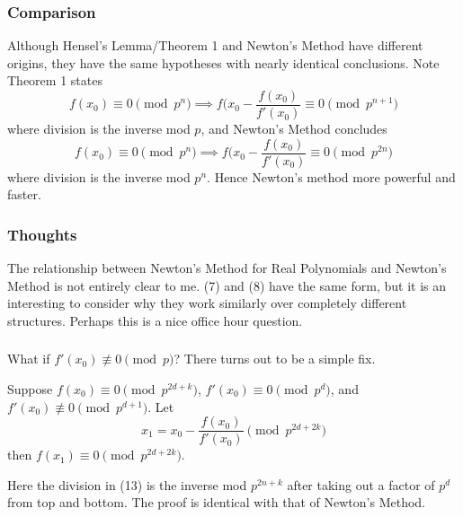 \documentclass{article}
\begin{document}
\subsubsection{Comparison}
Although Hensel's Lemma/Theorem 1 and Newton's Method have different origins, they have the same hypotheses with nearly identical conclusions. Note Theorem 1 states
\begin{equation}
    f(x_{0}) \equiv 0 \pmod{p^{n}} \implies
    f(x_{0}-\frac{f(x_{0})}{f'(x_{0})} \equiv 0 \pmod{p^{n+1}}
\end{equation}
where division is the inverse mod $p$, and Newton's Method concludes
\begin{equation}
    f(x_{0}) \equiv 0 \pmod{p^{n}} \implies
    f(x_{0}-\frac{f(x_{0})}{f'(x_{0})} \equiv 0 \pmod{p^{2n}}
\end{equation}
where division is the inverse mod $p^{n}$. Hence Newton's method more powerful and faster.

\subsubsection{Thoughts}
The relationship between Newton's Method for Real Polynomials and Newton's Method is not entirely clear to me. (7) and (8) have the same form, but it is an interesting to consider why they work similarly over completely different structures. Perhaps this is a nice office hour question.

\subsubsection{}
What if $f'(x_{0}) \not\equiv 0 \pmod{p}$? There turns out to be a simple fix.
\begin{thm}
    Suppose $f(x_{0}) \equiv 0 \pmod{p^{2d+k}}$, $f'(x_{0}) \equiv 0 \pmod{p^{d}}$, and $f'(x_{0}) \not\equiv 0 \pmod{p^{d+1}}$. Let
    \begin{equation}
        x_{1} = x_{0} - \frac{f(x_{0})}{f'(x_{0})} \pmod{p^{2d+2k}}
    \end{equation}
    then $f(x_{1})\equiv 0 \pmod{p^{2d+2k}}$.
\end{thm}
Here the division in (13) is the inverse mod ${p^{2n+k}}$ after taking out a factor of $p^{d}$ from top and bottom. The proof is identical with that of Newton's Method.
\end{document}

